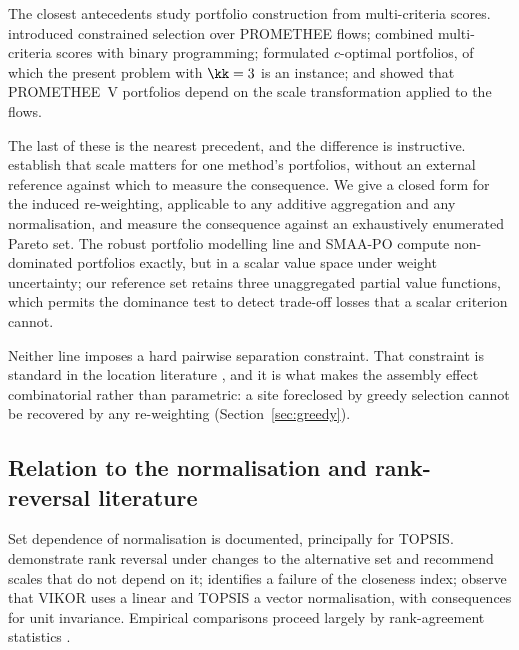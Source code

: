 The closest antecedents study portfolio construction from
multi-criteria scores.
\citet{BransMareschal1992} introduced constrained selection over
PROMETHEE flows; \citet{Mavrotas2006} combined multi-criteria scores
with binary programming; \citet{VetscheraDeAlmeida2012} formulated
$c$-optimal portfolios, of which the present problem with $\kk=3$ is an
instance; and \citet{DeAlmeidaVetschera2012} showed that PROMETHEE~V
portfolios depend on the scale transformation applied to the flows.

The last of these is the nearest precedent, and the difference is
instructive.
\citet{DeAlmeidaVetschera2012} establish that scale matters for one
method's portfolios, without an external reference against which to
measure the consequence.
We give a closed form for the induced re-weighting, applicable to any
additive aggregation and any normalisation, and measure the consequence
against an exhaustively enumerated Pareto set.
The robust portfolio modelling line \citep{Liesio2007,Liesio2008} and
SMAA-PO \citep{Yang2015} compute non-dominated portfolios exactly, but
in a scalar value space under weight uncertainty; our reference set
retains three unaggregated partial value functions, which permits the
dominance test to detect trade-off losses that a scalar criterion cannot.

Neither line imposes a hard pairwise separation constraint.
That constraint is standard in the location literature
\citep{MoonChaudhry1984,Erkut1996}, and it is what makes the assembly
effect combinatorial rather than parametric: a site foreclosed by greedy
selection cannot be recovered by any re-weighting
(Section~\ref{sec:greedy}).

\subsection{Relation to the normalisation and rank-reversal literature}

Set dependence of normalisation is documented, principally for TOPSIS.
\citet{GarciaCascales2012} demonstrate rank reversal under changes to
the alternative set and recommend scales that do not depend on it;
\citet{Kuo2017} identifies a failure of the closeness index;
\citet{OpricovicTzeng2004} observe that VIKOR uses a linear and TOPSIS
a vector normalisation, with consequences for unit invariance.
Empirical comparisons proceed largely by rank-agreement statistics
\citep{Jahan2015,Aytekin2021,Vafaei2018,Vafaei2022,Salabun2020Sym}.

